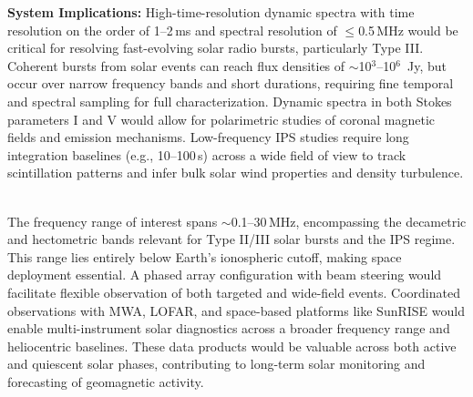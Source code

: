 \textbf{System Implications:} High-time-resolution dynamic spectra with time resolution on the order of 1--2\,ms and spectral resolution of $\leq$0.5\,MHz would be critical for resolving fast-evolving solar radio bursts, particularly Type III. Coherent bursts from solar events can reach flux densities of $\sim$10$^3$--10$^6$~Jy, but occur over narrow frequency bands and short durations, requiring fine temporal and spectral sampling for full characterization. Dynamic spectra in both Stokes parameters I and V would allow for polarimetric studies of coronal magnetic fields and emission mechanisms. Low-frequency IPS studies require long integration baselines (e.g., 10--100\,s) across a wide field of view to track scintillation patterns and infer bulk solar wind properties and density turbulence. \

The frequency range of interest spans $\sim$0.1--30\,MHz, encompassing the decametric and hectometric bands relevant for Type II/III solar bursts and the IPS regime. This range lies entirely below Earth's ionospheric cutoff, making space deployment essential. A phased array configuration with beam steering would facilitate flexible observation of both targeted and wide-field events. Coordinated observations with MWA, LOFAR, and space-based platforms like SunRISE would enable multi-instrument solar diagnostics across a broader frequency range and heliocentric baselines. These data products would be valuable across both active and quiescent solar phases, contributing to long-term solar monitoring and forecasting of geomagnetic activity. 




